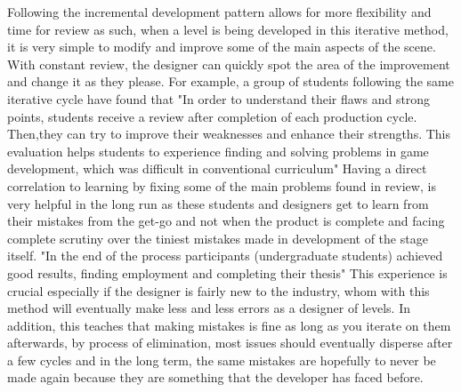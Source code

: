 \documentclass{scrartcl}
\begin{document}
Following the incremental development pattern allows for more flexibility and time for review as such, when a level is being developed in this iterative method, it is very simple to modify and improve some of the main aspects of the scene. With constant review, the designer can quickly spot the area of the improvement and change it as they please. For example, a group of students following the same iterative cycle have found that \cite{3} "In order to understand their flaws and strong points, students receive a review after completion of each production cycle. Then,they can try to improve their weaknesses and enhance their strengths. This evaluation helps students to experience finding and solving problems in game development, which was difficult in conventional curriculum" Having a direct correlation to learning by fixing some of the main problems found in review, is very helpful in the long run as these students and designers get to learn from their mistakes from the get-go and not when the product is complete and facing complete scrutiny over the tiniest mistakes made in development of the stage itself.\cite{3} "In the end of the process participants (undergraduate students) achieved good results, finding employment and completing their thesis" This experience is crucial especially if the designer is fairly new to the industry, whom with this method will eventually make less and less errors as a designer of levels. In addition, this teaches that making mistakes is fine as long as you iterate on them afterwards, by process of elimination, most issues should eventually disperse after a few cycles and in the long term, the same mistakes are hopefully to never be made again because they are something that the developer has faced before.
\end{document}
